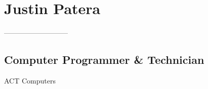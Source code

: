 \documentclass{article}        %
\begin{document}


\section{Justin Patera}

---------------------------

\subsection{Computer Programmer \& Technician}

ACT Computers
\end{document}
